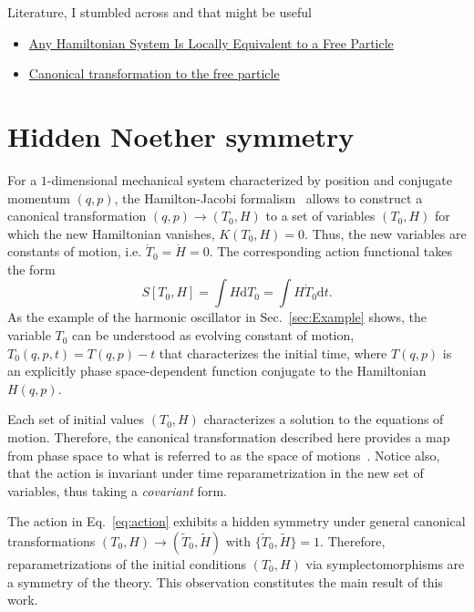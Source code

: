 \documentclass[twocolumn,notitlepage,superscriptaddress, nofootinbib,nobibnotes, aps,prd,10pt]{revtex4-1}%
\def\dd{\mathrm{d}}
\begin{document}
Literature, I stumbled across and that might be useful
\begin{itemize}
    \item \href{https://www.scirp.org/html/23892.html}{Any Hamiltonian System Is Locally Equivalent to a Free Particle}
    \item \href{https://sci-hub.ru/https://doi.org/10.1119/1.10618}{Canonical transformation to the free particle}
\end{itemize}

\section{Hidden Noether symmetry}\label{sec:Hidden Noether symmetry}



For a $1$-dimensional mechanical system characterized by position and conjugate momentum $(q,p)$, the Hamilton-Jacobi formalism~\cite{Goldstein1980} allows to construct a canonical transformation $(q,p)\rightarrow (T_0,H)$ to a set of variables $(T_0,H)$ for which the new Hamiltonian vanishes,  $K(T_0,H) = 0$. Thus, the new variables are constants of motion, i.e. $\dot{T}_0 = \dot{H} = 0$. The corresponding action functional takes the form
%
\begin{equation}\label{eq:action}
S[T_0,H] = \int H\dd{T}_0 = \int H\dot{T}_0\dd{t}.
\end{equation}
%
As the example of the harmonic oscillator in Sec.~\ref{sec:Example} shows, the variable $T_0$ can be understood as evolving constant of motion, $T_0(q,p,t)= T(q,p)-t$ that characterizes the initial time, where $T(q,p)$ is an explicitly phase space-dependent function conjugate to the Hamiltonian $H(q,p)$. 

Each set of initial values $(T_0,H)$ characterizes a solution to the equations of motion. Therefore, the canonical transformation described here provides a map from phase space to what is referred to as the space of motions~\cite{Woodhouse1992,Rovelli:2001bq}. Notice also, that the action is invariant under time reparametrization in the new set of variables, thus taking a \textit{covariant} form. 

The action in Eq.~\eqref{eq:action} exhibits a hidden symmetry under general canonical transformations $(T_0,H)\rightarrow (\tilde{T}_0,\tilde{H})$ with $\{\tilde{T}_0,\tilde{H}\} = 1$. Therefore, reparametrizations of the initial conditions $(T_0,H)$ via symplectomorphisms are a symmetry of the theory. This observation constitutes the main result of this work. 
\end{document}
